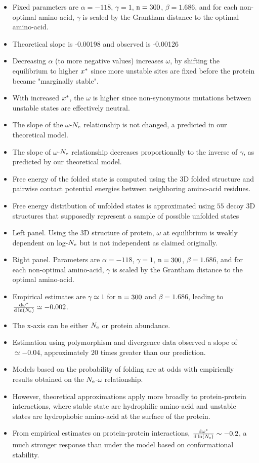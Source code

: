 \documentclass{article}
\begin{document}
\newpage
\begin{itemize}
	\item Fixed parameters are $\alpha=-118$, $\gamma=1$, $\text{n}=300$, $\beta=1.686$, and for each non-optimal amino-acid, $\gamma$ is scaled by the Grantham distance to the optimal amino-acid.
	\item Theoretical slope is -0.00198 and observed is -0.00126
	\item Decreasing $\alpha$ (to more negative values) increases $\omega$, by shifting the equilibrium to higher $x^{*}$ since more unstable sites are fixed before the protein became "marginally stable".  
	\item With increased $x^{*}$, the $\omega$ is higher since non-synonymous mutations between unstable states are effectively neutral.
	\item The slope of the $\omega$-$N_{\mathrm{e}}$ relationship is not changed, a predicted in our theoretical model.
	\item The slope of $\omega$-$N_{\mathrm{e}}$ relationship decreases proportionally to the inverse of $\gamma$, as predicted by our theoretical model.
	\item Free energy of the folded state is computed using the $3$D folded structure and pairwise contact potential energies between neighboring amino-acid residues.
	\item Free energy distribution of unfolded states is approximated using $55$ decoy $3$D structures that supposedly represent a sample of possible unfolded states
	\item Left panel. Using the 3D structure of protein, $\omega$ at equilibrium is weakly dependent on log-$N_{\mathrm{e}}$ but is not independent as claimed originally.
	\item Right panel. Parameters are $\alpha=-118$, $\gamma=1$, $\text{n}=300$, $\beta=1.686$, and for each non-optimal amino-acid, $\gamma$ is scaled by the Grantham distance to the optimal amino-acid.
	\item Empirical estimates are $\gamma \simeq 1$ for $\text{n}=300$ and $\beta=1.686$, leading to $\frac{ \mathrm{d} \omega^{*}}{\mathrm{d} \ln (N_{\mathrm{e}})} \simeq -0.002$.
	\item The x-axis can be either $N_{\mathrm{e}}$ or protein abundance.
	\item Estimation using polymorphism and divergence data observed a slope of $\simeq -0.04$, approximately $20$ times greater than our prediction. 
	\item Models based on the probability of folding are at odds with empirically results obtained on the $N_{\mathrm{e}}$-$\omega$ relationship.
	\item However, theoretical approximations apply more broadly to protein-protein interactions, where stable state are hydrophilic amino-acid and unstable states are hydrophobic amino-acid at the surface of the protein.
	\item From empirical estimates on protein-protein interactions, $\frac{ \mathrm{d} \omega^{*}}{\mathrm{d} \ln (N_{\mathrm{e}})} \sim -0.2$, a much stronger response than under the model based on conformational stability.
\end{itemize}
\end{document}

